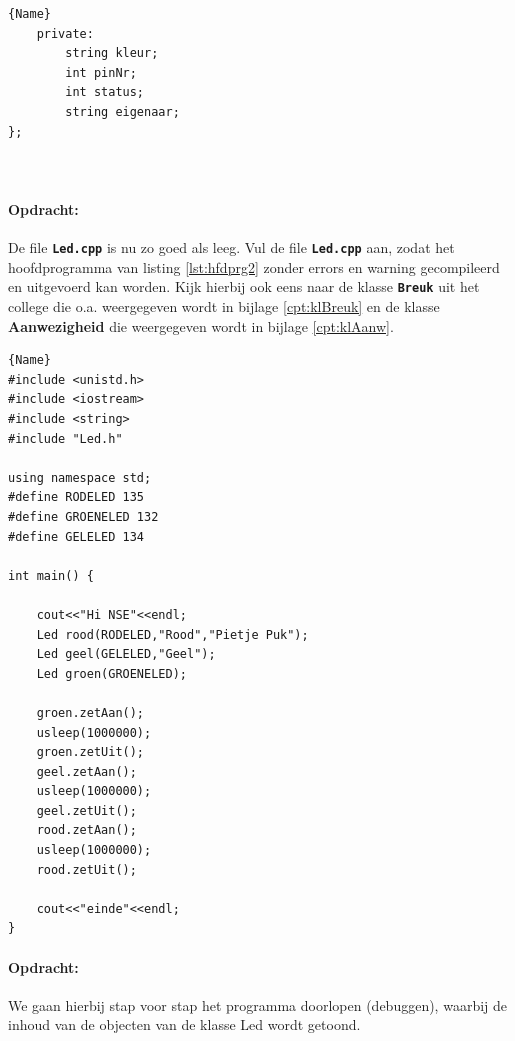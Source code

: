 \begin{enumerate}
\begin{itemize}
\begin{minipage}{.45\textwidth}
\begin{lstlisting}[caption=LED declaratie file(.h),frame=tlrb,label={lst:ledH}]{Name}
	private:
		string kleur;
		int pinNr;
		int status;  
		string eigenaar;
};
		
		
	\end{lstlisting}
	
\end{minipage}

\newpage	
\paragraph{Opdracht:} De file \textbf{\texttt{Led.cpp}} is nu zo goed als leeg. Vul de file \textbf{\texttt{Led.cpp}} aan, zodat het hoofdprogramma van listing \ref{lst:hfdprg2} zonder errors en warning gecompileerd en uitgevoerd kan worden. Kijk hierbij ook eens naar de klasse \textbf{\texttt{Breuk}} uit het college die o.a. weergegeven wordt in bijlage \ref{cpt:klBreuk} en de klasse \textbf{Aanwezigheid} die weergegeven wordt in bijlage \ref{cpt:klAanw}.
\begin{lstlisting}[caption=Hoofdprogramma om de LED uit te testen ,frame=tlrb, label={lst:hfdprg2}]{Name}
#include <unistd.h>
#include <iostream>
#include <string>
#include "Led.h"

using namespace std;
#define RODELED 135
#define GROENELED 132
#define GELELED 134

int main() {
	
	cout<<"Hi NSE"<<endl;
	Led rood(RODELED,"Rood","Pietje Puk");
	Led geel(GELELED,"Geel");
	Led groen(GROENELED);
	
	groen.zetAan();
	usleep(1000000);
	groen.zetUit();
	geel.zetAan();
	usleep(1000000);
	geel.zetUit();
	rood.zetAan();
	usleep(1000000);  
	rood.zetUit();
	
	cout<<"einde"<<endl;
}

\end{lstlisting}	
\end{itemize}
\end{enumerate}

\paragraph{Opdracht:}
We gaan hierbij stap voor stap het programma doorlopen (debuggen), waarbij de inhoud van de objecten van de klasse Led wordt getoond.

